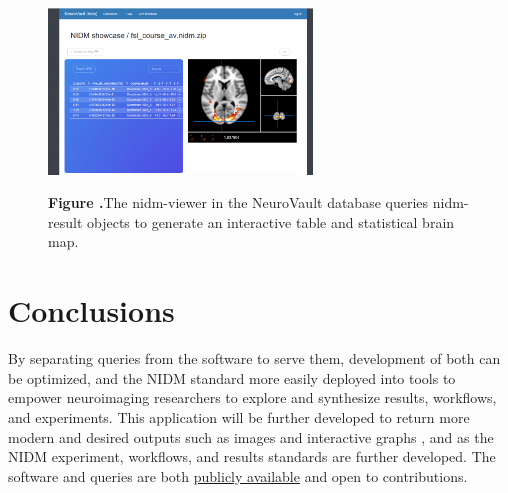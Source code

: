 \documentclass[twocolumn]{bmcart}%
\begin{document}
\begin{figure}[h!]
\begin{center}
\includegraphics[width=7cm]{img/figure1}
\end{center}
 \textbf{\label{fig:01}Figure .}{The nidm-viewer in the NeuroVault database queries nidm-result objects to generate an interactive table and statistical brain map.}
\end{figure}

\section{Conclusions}\label{conclusions}

By separating queries from the software to serve them, development of both can be optimized, and the NIDM standard more easily deployed into tools to empower neuroimaging researchers to explore and synthesize results, workflows, and experiments. This application will be further developed to return more modern and desired outputs such as images and interactive graphs \cite{noauthor_undated-fs}, and as the NIDM experiment, workflows, and results standards are further developed. The software and queries are both \href{https://github.com/incf-nidash}{publicly available} and open to contributions.

\end{document}
